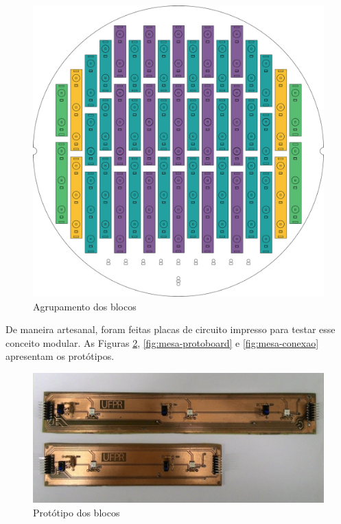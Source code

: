 \documentclass[a4paper,12pt]{article}
\begin{document}
  \begin{figure}[!h]
    \caption{Agrupamento dos blocos}
    \label{fig:mesa-placas}
    \centering
    \includegraphics[width=0.8\linewidth]{img/mesa-placas.png}
  \end{figure}  
	
  \clearpage	
	
  De maneira artesanal, foram feitas placas de circuito impresso para testar esse conceito modular. As Figuras \ref{fig:mesa-blocos}, \ref{fig:mesa-protoboard} e \ref{fig:mesa-conexao} apresentam os protótipos.
   
  \begin{figure}[!ht]
    \caption{Protótipo dos blocos}
    \label{fig:mesa-blocos}
    \centering
    \includegraphics[width=0.9\linewidth]{img/mesa-blocos.jpg}
  \end{figure}  
   
\end{document}
